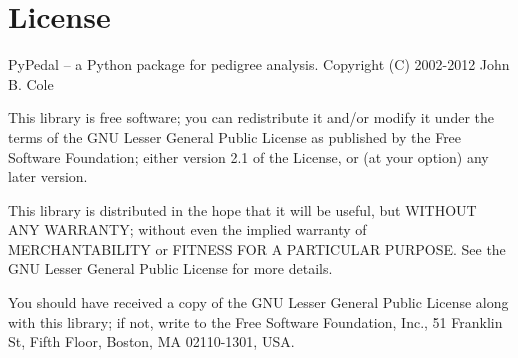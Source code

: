 \chapter{License}
\label{cha:license}

Py{P}edal -- a Python package for pedigree analysis.
Copyright (C) 2002-2012  John B. Cole

This library is free software; you can redistribute it and/or modify it
under the terms of the GNU Lesser General Public License as published by
the Free Software Foundation; either version 2.1 of the License, or (at
your option) any later version.

This library is distributed in the hope that it will be useful, but
WITHOUT ANY WARRANTY; without even the implied warranty of
MERCHANTABILITY or FITNESS FOR A PARTICULAR PURPOSE.  See the GNU
Lesser General Public License for more details.

You should have received a copy of the GNU Lesser General Public
License along with this library; if not, write to the Free Software
Foundation, Inc., 51 Franklin St, Fifth Floor, Boston, MA 02110-1301,
USA.